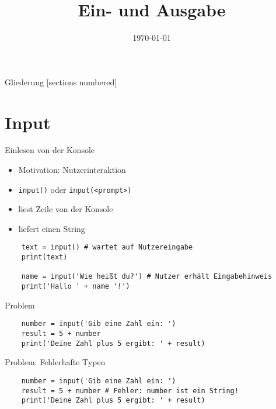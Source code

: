 



\title{Ein- und Ausgabe}
\date{\today}




\maketitle

\begin{frame}{Gliederung}
    [sections numbered]
    \tableofcontents
\end{frame}

\section{Input}
\begin{frame}[fragile]{Einlesen von der Konsole}
	\begin{itemize}
		\item Motivation: Nutzerinteraktion
		\item \texttt{input()} oder \texttt{input(<prompt>)}
		\item liest Zeile von der Konsole
		\item liefert einen String
	\end{itemize}

	\begin{lstlisting}
	text = input() # wartet auf Nutzereingabe
	print(text)

	name = input('Wie heißt du?') # Nutzer erhält Eingabehinweis
	print('Hallo ' + name '!')
    	\end{lstlisting}
\end{frame}

\begin{frame}[fragile]{Problem}
	\begin{lstlisting}
	number = input('Gib eine Zahl ein: ')
	result = 5 + number
	print('Deine Zahl plus 5 ergibt: ' + result)
	\end{lstlisting}
\end{frame}

\begin{frame}[fragile]{Problem: Fehlerhafte Typen}
	\begin{lstlisting}
	number = input('Gib eine Zahl ein: ')
	result = 5 + number # Fehler: number ist ein String!
	print('Deine Zahl plus 5 ergibt: ' + result)
	\end{lstlisting}
\end{frame}



